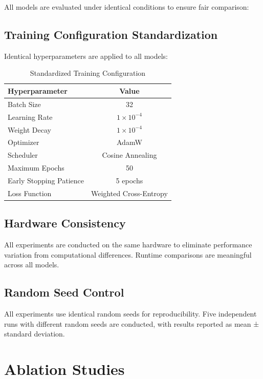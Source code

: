 All models are evaluated under identical conditions to ensure fair comparison:

\subsection{Training Configuration Standardization}

Identical hyperparameters are applied to all models:

\begin{table}[H]
\centering
\caption{Standardized Training Configuration}
\label{tab:training_config}
\begin{tabular}{|l|c|}
\hline
\textbf{Hyperparameter} & \textbf{Value} \\
\hline
Batch Size & 32 \\
Learning Rate & $1 \times 10^{-4}$ \\
Weight Decay & $1 \times 10^{-4}$ \\
Optimizer & AdamW \\
Scheduler & Cosine Annealing \\
Maximum Epochs & 50 \\
Early Stopping Patience & 5 epochs \\
Loss Function & Weighted Cross-Entropy \\
\hline
\end{tabular}
\end{table}

\subsection{Hardware Consistency}

All experiments are conducted on the same hardware to eliminate performance variation from computational differences. Runtime comparisons are meaningful across all models.

\subsection{Random Seed Control}

All experiments use identical random seeds for reproducibility. Five independent runs with different random seeds are conducted, with results reported as mean ± standard deviation.

\section{Ablation Studies}

